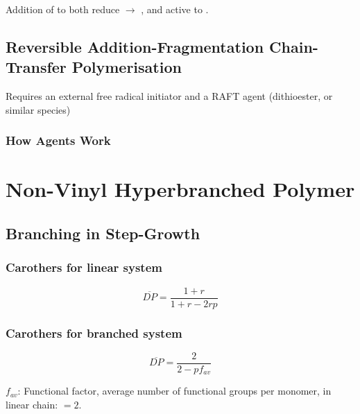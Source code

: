\documentclass{NoteThesis/note-thesis}
\begin{document}
Addition of  to both reduce  $\rightarrow$ , and active  to .

\subsection[RAFT]{Reversible Addition-Fragmentation Chain-Transfer Polymerisation}

Requires an external free radical initiator and a RAFT agent (dithioester, or similar species)

\subsubsection*{How Agents Work}

\begin{center}
\end{center}

\section{Non-Vinyl Hyperbranched Polymer}

\subsection{Branching in Step-Growth}

\subsubsection*{Carothers for linear system}

\begin{equation*}
    \overline{DP} = \frac{1+r}{1+r-2rp}
\end{equation*}

\subsubsection*{Carothers for branched system}

\begin{equation*}
    \overline{DP} = \frac{2}{2-p f_{av}}
\end{equation*}

$f_{av}$: Functional factor, average number of functional groups per monomer, in linear chain: $=2$.
\end{document}
